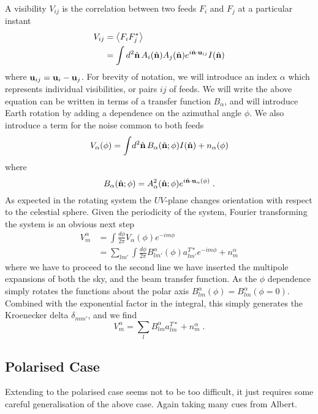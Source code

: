 \documentclass[onecolumn]{revtex4}
\begin{document}
A visibility $V_{ij}$ is the correlation between two feeds $F_i$ and $F_j$ at a
particular instant
\begin{align}
  V_{ij} & = \left\langle F_i F_j^* \right\rangle \\
  &= \int d^2\hat{\mathbf{n}} \, A_i(\hat{\mathbf{n}}) A_j(\hat{\mathbf{n}}) e^{i \hat{\mathbf{n}} \cdot \mathbf{u}_{ij}}
  I(\hat{\mathbf{n}})
\end{align}
where $\mathbf{u}_{ij} = \mathbf{u}_i - \mathbf{u}_j$. For brevity of notation, we will introduce an
index $\alpha$ which represents individual visibilities, or pairs $ij$ of
feeds. We will write the above equation can be written in terms of a transfer
function $B_\alpha$, and will introduce Earth rotation by adding a dependence on
the azimuthal angle $\phi$. We also introduce a term for the noise common to
both feeds
\begin{equation}
  V_\alpha(\phi) = \int \! d^2\hat{\mathbf{n}}\, B_\alpha(\hat{\mathbf{n}}; \phi) I(\hat{\mathbf{n}})
  + n_\alpha(\phi)
\end{equation}
where
\begin{equation}
  B_\alpha(\hat{\mathbf{n}}; \phi) = A_\alpha^2(\hat{\mathbf{n}}; \phi) e^{i \hat{\mathbf{n}} \cdot
    \mathbf{u}_{\alpha}(\phi)} \; .
\end{equation}
As expected in the rotating system the $UV$-plane changes orientation with
respect to the celestial sphere. Given the periodicity of the system, Fourier
transforming the system is an obvious next step
\begin{align}
  V^\alpha_m &= \int \frac{d\phi}{2\pi} V_\alpha(\phi) e^{-i m \phi} \\
  & = \sum_{l m'}\int \frac{d\phi}{2\pi} B^\alpha_{l m'}(\phi) a^{T*}_{l m'}
  e^{-i m \phi}+ n^\alpha_m
\end{align}
where we have to proceed to the second line we have inserted the multipole
expansions of both the sky, and the beam transfer function. As the $\phi$
dependence simply rotates the functions about the polar axis
$B^\alpha_{lm}(\phi) = B^{\alpha}_{lm}(\phi=0)$. Combined with the exponential
factor in the integral, this simply generates the Kroenecker delta
$\delta_{mm'}$, and we find
\begin{equation}
V^\alpha_m = \sum_{l} B^\alpha_{l m} a^{T*}_{l m}+ n^\alpha_m \; .
\end{equation}

\subsection{Polarised Case}

Extending to the polarised case seems not to be too difficult, it just requires
some careful generalisation of the above case. Again taking many cues from
Albert.
\end{document}
